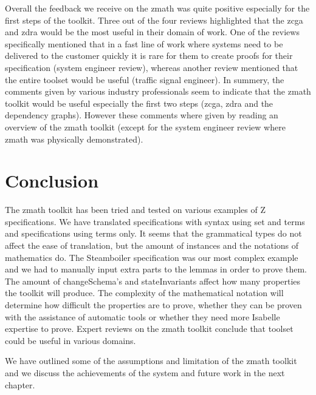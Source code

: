 Overall the feedback we receive on the \gls{zmath} was quite positive especially
for the first steps of the toolkit. Three out of the four reviews highlighted
that the \gls{zcga} and \gls{zdra} would be the most useful in their domain of
work. One of the reviews specifically mentioned that in a fast line of work
where systems need to be delivered to the customer quickly it is rare for them
to create proofs for their specification (system engineer review), whereas
another review mentioned that the entire toolset would be useful (traffic signal
engineer). In summery, the comments given by various industry professionals seem
to indicate that the \gls{zmath} toolkit would be useful especially the first
two steps (\gls{zcga}, \gls{zdra} and the dependency graphs). However these
comments where given by reading an overview of the \gls{zmath} toolkit (except
for the system engineer review where \gls{zmath} was physically demonstrated).

\section{Conclusion}

The \gls{zmath} toolkit has been tried and tested on various examples of Z
specifications. We have translated specifications with syntax using set and
terms and specifications using terms only. It seems that the grammatical types
do not affect the ease of translation, but the amount of instances and the
notations of mathematics do. The Steamboiler specification was our most complex
example and we had to manually input extra parts to the lemmas in order to prove
them. The amount of changeSchema's and stateInvariants affect how many
properties the toolkit will produce. The complexity of the mathematical notation
will determine how difficult the properties are to prove, whether they can be
proven with the assistance of automatic tools or whether they need more Isabelle
expertise to prove. Expert reviews on the \gls{zmath} toolkit conclude that
toolset could be useful in various domains.

We have outlined some of the assumptions and limitation of the \gls{zmath}
toolkit and we discuss the achievements of the system and future work in the next
chapter.